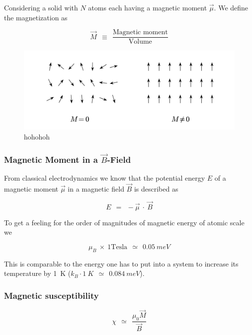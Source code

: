 \documentclass[10pt]{report}
\numberwithin{equation}{chapter}
\begin{document}
Considering a solid with $N$ atoms each having a magnetic moment $\vec{\mu}$. We define the magnetization as 

\begin{equation}
  \vec{M} ~~\equiv~~ \frac{\text{Magnetic moment}}{\text{Volume}}
\end{equation}

\begin{figure}
  \centering
  \includegraphics[width=0.8\linewidth]{../img/mag_in_solid.pdf}
  \caption{hohohoh}
\end{figure}

\subsubsection{Magnetic Moment in a $\vec{B}$-Field}


From classical electrodynamics we know that the potential energy $E$ of a magnetic moment $\vec{\mu}$ in a magnetic field $\vec{B}$ is described as

\begin{equation}
  E ~~=~~ - \vec{\mu} ~\cdot~ \vec{B}
\end{equation}

To get a feeling for the order of magnitudes of magnetic energy of atomic scale we 

\begin{equation*}
  \mu_B ~\times~ 1 \text{Tesla} ~~\simeq~~ \SI{0.05}{meV}
\end{equation*}

This is comparable to the energy one has to put into a system to increase its temperature by \SI[mode=text]{1}{K} ($ k_B \cdot \SI{1}{K} ~~\simeq~~ \SI{0.084}{meV}$).


\subsubsection{Magnetic susceptibility}

\begin{equation} \label{eq:mag_suscept}
  \chi ~~≃~~ \frac{\mu_0 \vec{M}}{\vec{B}}
\end{equation}
\end{document}
